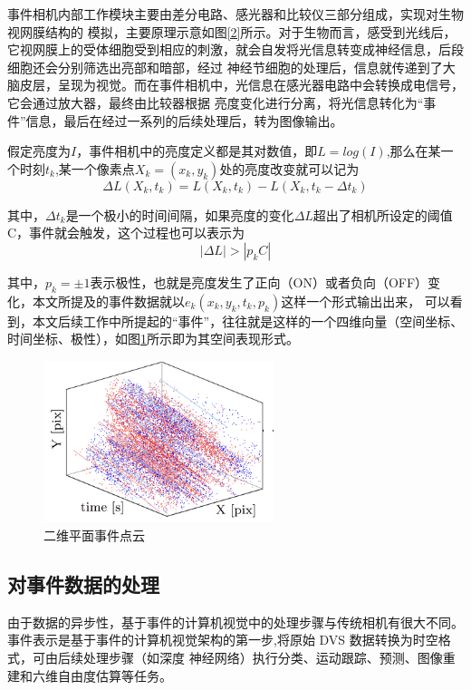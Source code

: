 事件相机内部工作模块主要由差分电路、感光器和比较仪三部分组成，实现对生物视网膜结构的
模拟，主要原理示意如图\ref{2}所示。对于生物而言，感受到光线后，它视网膜上的受体细胞受到相应的刺激，就会自发将光信息转变成神经信息，后段细胞还会分别筛选出亮部和暗部，经过
神经节细胞的处理后，信息就传递到了大脑皮层，呈现为视觉。而在事件相机中，光信息在感光器电路中会转换成电信号，它会通过放大器，最终由比较器根据
亮度变化进行分离，将光信息转化为“事件”信息，最后在经过一系列的后续处理后，转为图像输出。\cite{eibensteiner2017event}

假定亮度为$I$，事件相机中的亮度定义都是其对数值，即$L=log(I)$,那么在某一个时刻$t_k$,某一个像素点$X_k=(x_k,y_k)$处的亮度改变就可以记为
\begin{equation} 
    \Delta L(X_k,t_k)=L(X_k,t_k)-L(X_k,t_k-\Delta t_k)
\end{equation}

其中，$\Delta t_k$是一个极小的时间间隔，如果亮度的变化$\Delta L$超出了相机所设定的阈值C，事件就会触发，这个过程也可以表示为
\begin{equation} 
    |\Delta L|>|p_kC|
\end{equation}

其中，$p_k=\pm1$表示极性，也就是亮度发生了正向（ON）或者负向（OFF）变化，本文所提及的事件数据就以$e_k(x_k,y_k,t_k,p_k)$这样一个形式输出出来，
可以看到，本文后续工作中所提起的“事件”，往往就是这样的一个四维向量（空间坐标、
时间坐标、极性），如图\ref{4}所示即为其空间表现形式。
\begin{figure}
    \centering
    \includegraphics[width=0.6\textwidth]{figures/event_stream.png}
    \caption{二维平面事件点云}
    \label{4}
\end{figure}

\subsection{对事件数据的处理}
由于数据的异步性，基于事件的计算机视觉中的处理步骤与传统相机有很大不同。
事件表示是基于事件的计算机视觉架构的第一步,将原始 DVS 数据转换为时空格式，可由后续处理步骤（如深度
神经网络）执行分类、运动跟踪、预测、图像重建和六维自由度估算等任务。

